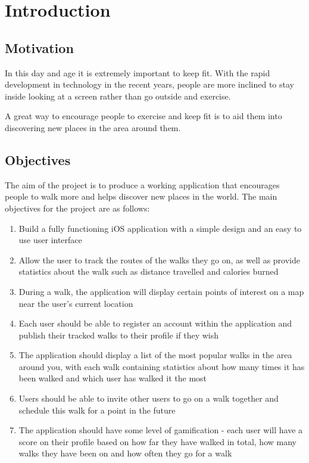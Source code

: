 \chapter{Introduction}

\section{Motivation}


In this day and age it is extremely important to keep fit. With the rapid development in technology in the recent years, people are more inclined to stay inside looking at a screen rather than go outside and exercise.

A great way to encourage people to exercise and keep fit is to aid them into discovering new places in the area around them. 

\section{Objectives} \label{section:objectives}

The aim of the project is to produce a working application that encourages people to walk more and helps discover new places in the world. The main objectives for the project are as follows:

\begin{enumerate}[label=\textbf{Obj \arabic*}]
    \item Build a fully functioning iOS application with a simple design and an easy to use user interface
    \item Allow the user to track the routes of the walks they go on, as well as provide statistics about the walk such as distance travelled and calories burned
    \item During a walk, the application will display certain points of interest on a map near the user's current location
    \item Each user should be able to register an account within the application and publish their tracked walks to their profile if they wish
    \item The application should display a list of the most popular walks in the area around you, with each walk containing statistics about how many times it has been walked and which user has walked it the most
    \item Users should be able to invite other users to go on a walk together and schedule this walk for a point in the future
    \item The application should have some level of gamification - each user will have a score on their profile based on how far they have walked in total, how many walks they have been on and how often they go for a walk
\end{enumerate}







